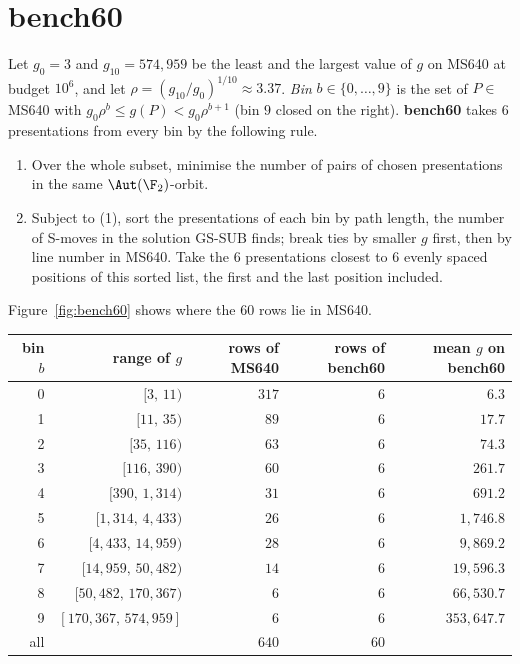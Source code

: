 \section{bench60}\label{app:bench60}

\begin{definition}\label{def:bench60full}
Let $g_0=3$ and $g_{10}=574{,}959$ be the least and the largest value of $g$ on MS640 at budget $10^6$, and
let $\rho=(g_{10}/g_0)^{1/10}\approx3.37$. \emph{Bin} $b\in\{0,\dots,9\}$ is the set of $P\in$ MS640 with
$g_0\rho^{b}\le g(P)<g_0\rho^{b+1}$ (bin $9$ closed on the right). \textbf{bench60} takes $6$ presentations from every
bin by the following rule.
\begin{enumerate}
  \item Over the whole subset, minimise the number of pairs of chosen presentations in the same $\Aut(\F_2)$-orbit.
  \item Subject to (1), sort the presentations of each bin by path length, the number of S-moves in the solution GS-SUB finds; break ties by smaller $g$ first, then by line number in MS640.
  Take the $6$ presentations closest to $6$ evenly spaced positions of this sorted list, the first and the last
  position included.
\end{enumerate}
\end{definition}

Figure~\ref{fig:bench60} shows where the $60$ rows lie in MS640.

\begin{center}
\begin{tabular}{rrrrr}
\toprule
bin $b$ & range of $g$ & rows of MS640 & rows of bench60 & mean $g$ on bench60\\
\midrule
0 & $[3,\,11)$ & $317$ & $6$ & $6.3$\\
1 & $[11,\,35)$ & $89$ & $6$ & $17.7$\\
2 & $[35,\,116)$ & $63$ & $6$ & $74.3$\\
3 & $[116,\,390)$ & $60$ & $6$ & $261.7$\\
4 & $[390,\,1{,}314)$ & $31$ & $6$ & $691.2$\\
5 & $[1{,}314,\,4{,}433)$ & $26$ & $6$ & $1{,}746.8$\\
6 & $[4{,}433,\,14{,}959)$ & $28$ & $6$ & $9{,}869.2$\\
7 & $[14{,}959,\,50{,}482)$ & $14$ & $6$ & $19{,}596.3$\\
8 & $[50{,}482,\,170{,}367)$ & $6$ & $6$ & $66{,}530.7$\\
9 & $[170{,}367,\,574{,}959]$ & $6$ & $6$ & $353{,}647.7$\\
\midrule
all & & $640$ & $60$ & \\
\bottomrule
\end{tabular}
\end{center}

